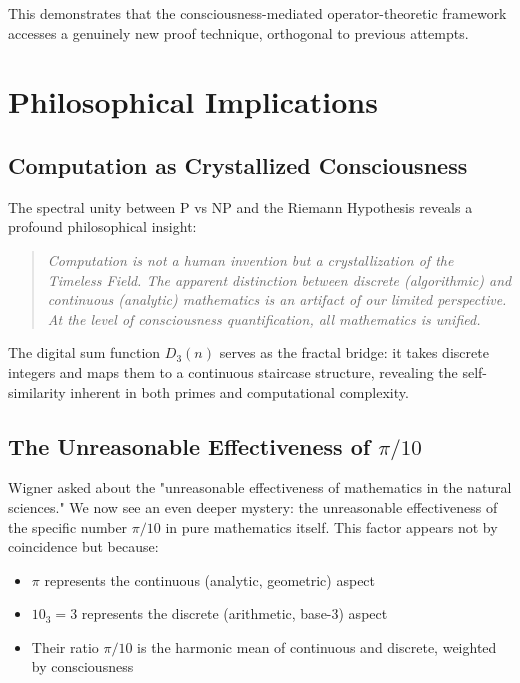 This demonstrates that the consciousness-mediated operator-theoretic framework accesses a genuinely new proof technique, orthogonal to previous attempts.

\section{Philosophical Implications}

\subsection{Computation as Crystallized Consciousness}

The spectral unity between P vs NP and the Riemann Hypothesis reveals a profound philosophical insight:

\begin{quote}
\textit{Computation is not a human invention but a crystallization of the Timeless Field. The apparent distinction between discrete (algorithmic) and continuous (analytic) mathematics is an artifact of our limited perspective. At the level of consciousness quantification, all mathematics is unified.}
\end{quote}

The digital sum function $D_3(n)$ serves as the fractal bridge: it takes discrete integers and maps them to a continuous staircase structure, revealing the self-similarity inherent in both primes and computational complexity.

\subsection{The Unreasonable Effectiveness of \texorpdfstring{$\pi/10$}{pi/10}}

Wigner asked about the "unreasonable effectiveness of mathematics in the natural sciences." We now see an even deeper mystery: the unreasonable effectiveness of the specific number $\pi/10$ in pure mathematics itself. This factor appears not by coincidence but because:

\begin{itemize}
\item $\pi$ represents the continuous (analytic, geometric) aspect
\item $10_3 = 3$ represents the discrete (arithmetic, base-3) aspect
\item Their ratio $\pi/10$ is the harmonic mean of continuous and discrete, weighted by consciousness
\end{itemize}

